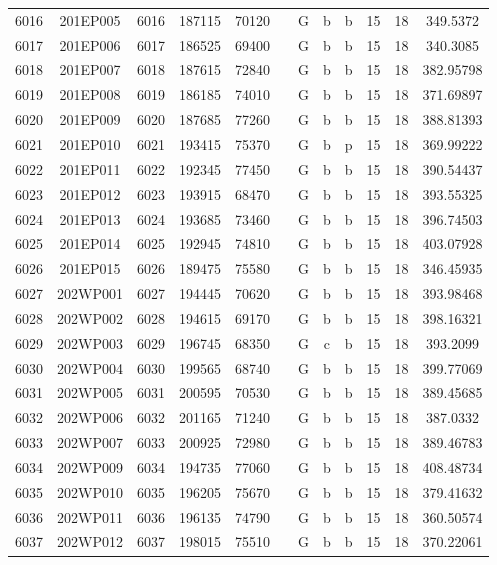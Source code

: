 \begin{tabular}{|*{12}{c|}}
6016 & 201EP005 & 6016 & 187115 & 70120 &  & G & b & b & 15 & 18 & 349.5372 \\ 
6017 & 201EP006 & 6017 & 186525 & 69400 &  & G & b & b & 15 & 18 & 340.3085 \\ 
6018 & 201EP007 & 6018 & 187615 & 72840 &  & G & b & b & 15 & 18 & 382.95798 \\ 
6019 & 201EP008 & 6019 & 186185 & 74010 &  & G & b & b & 15 & 18 & 371.69897 \\ 
6020 & 201EP009 & 6020 & 187685 & 77260 &  & G & b & b & 15 & 18 & 388.81393 \\ 
6021 & 201EP010 & 6021 & 193415 & 75370 &  & G & b & p & 15 & 18 & 369.99222 \\ 
6022 & 201EP011 & 6022 & 192345 & 77450 &  & G & b & b & 15 & 18 & 390.54437 \\ 
6023 & 201EP012 & 6023 & 193915 & 68470 &  & G & b & b & 15 & 18 & 393.55325 \\ 
6024 & 201EP013 & 6024 & 193685 & 73460 &  & G & b & b & 15 & 18 & 396.74503 \\ 
6025 & 201EP014 & 6025 & 192945 & 74810 &  & G & b & b & 15 & 18 & 403.07928 \\ 
6026 & 201EP015 & 6026 & 189475 & 75580 &  & G & b & b & 15 & 18 & 346.45935 \\ 
6027 & 202WP001 & 6027 & 194445 & 70620 &  & G & b & b & 15 & 18 & 393.98468 \\ 
6028 & 202WP002 & 6028 & 194615 & 69170 &  & G & b & b & 15 & 18 & 398.16321 \\ 
6029 & 202WP003 & 6029 & 196745 & 68350 &  & G & c & b & 15 & 18 & 393.2099 \\ 
6030 & 202WP004 & 6030 & 199565 & 68740 &  & G & b & b & 15 & 18 & 399.77069 \\ 
6031 & 202WP005 & 6031 & 200595 & 70530 &  & G & b & b & 15 & 18 & 389.45685 \\ 
6032 & 202WP006 & 6032 & 201165 & 71240 &  & G & b & b & 15 & 18 & 387.0332 \\ 
6033 & 202WP007 & 6033 & 200925 & 72980 &  & G & b & b & 15 & 18 & 389.46783 \\ 
6034 & 202WP009 & 6034 & 194735 & 77060 &  & G & b & b & 15 & 18 & 408.48734 \\ 
6035 & 202WP010 & 6035 & 196205 & 75670 &  & G & b & b & 15 & 18 & 379.41632 \\ 
6036 & 202WP011 & 6036 & 196135 & 74790 &  & G & b & b & 15 & 18 & 360.50574 \\ 
6037 & 202WP012 & 6037 & 198015 & 75510 &  & G & b & b & 15 & 18 & 370.22061 \\ 

\end{tabular}
